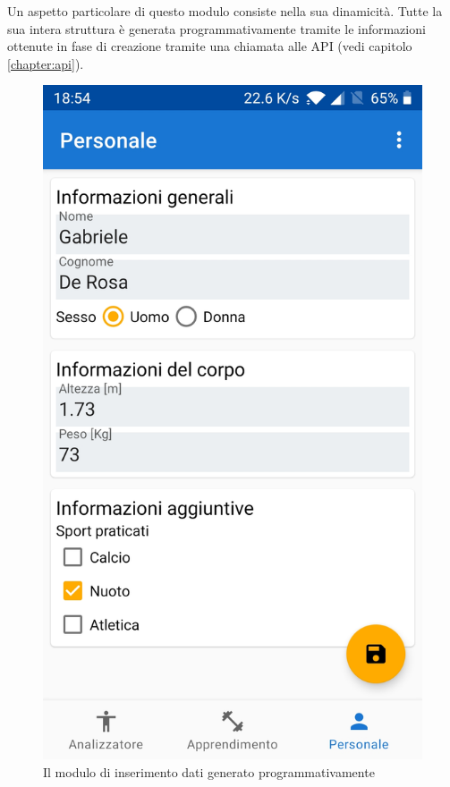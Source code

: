 Un aspetto particolare di questo modulo consiste nella sua dinamicità. Tutte la sua intera struttura è generata programmativamente 
tramite le informazioni ottenute in fase di creazione tramite una chiamata alle API (vedi capitolo \ref{chapter:api}).

\begin{figure}[H]
    \centering
    \includegraphics[scale = 0.10]{assets/images/screenshots/3a_Init.jpg}    
    \caption{Il modulo di inserimento dati generato programmativamente}
    \label{fig:screenshots_personal}
\end{figure}

